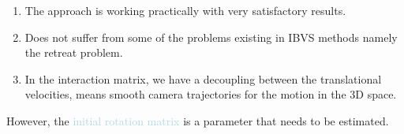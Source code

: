 \begin{enumerate}\compresslist
  \item The approach is working practically with very satisfactory results.
  \item Does not suffer from some of the problems existing in IBVS methods namely the retreat problem.
  \item In the interaction matrix, we have a decoupling between the translational velocities, means smooth camera trajectories for the motion in the 3D space.
\end{enumerate}
However, the \textcolor{lightblue}{initial rotation matrix} is a parameter that needs to be estimated.
